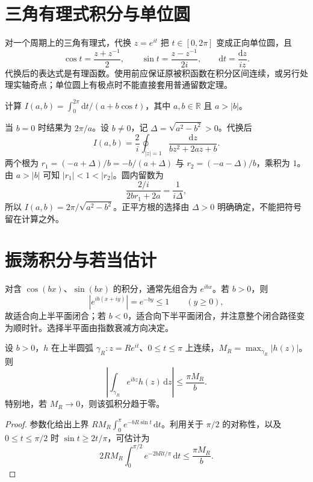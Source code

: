 \documentclass[UTF8,12pt,a4paper,fontset=fandol]{ctexbook}
\begin{document}
\section{三角有理式积分与单位圆}

对一个周期上的三角有理式，代换 $z=e^{it}$ 把 $t\in[0,2\pi]$ 变成正向单位圆，且
\begin{equation}
 \cos t=\frac{z+z^{-1}}2,\qquad
 \sin t=\frac{z-z^{-1}}{2i},\qquad
 \mathrm dt=\frac{\mathrm dz}{iz}.
 \label{eq:cv-trig-substitution}
\end{equation}
代换后的表达式是有理函数。使用前应保证原被积函数在积分区间连续，或另行处理实轴奇点；单位圆上有极点时不能直接套用普通留数定理。

\begin{example}[参数积分]
计算 $I(a,b)=\int_0^{2\pi}\mathrm dt/(a+b\cos t)$，其中 $a,b\in\mathbb R$ 且 $a>|b|$。
\end{example}
\begin{solve}
当 $b=0$ 时结果为 $2\pi/a$。设 $b\ne0$，记 $\Delta=\sqrt{a^2-b^2}>0$。代换后
\[
 I(a,b)=\frac2i\oint_{|z|=1}\frac{\mathrm dz}{bz^2+2az+b}.
\]
两个根为 $r_1=(-a+\Delta)/b=-b/(a+\Delta)$ 与 $r_2=(-a-\Delta)/b$，乘积为 $1$。由 $a>|b|$ 可知 $|r_1|<1<|r_2|$。圆内留数为
\[
 \frac{2/i}{2br_1+2a}=\frac1{i\Delta},
\]
所以 $I(a,b)=2\pi/\sqrt{a^2-b^2}$。正平方根的选择由 $\Delta>0$ 明确确定，不能把符号留在计算之外。
\end{solve}

\section{振荡积分与若当估计}

对含 $\cos(bx)$、$\sin(bx)$ 的积分，通常先组合为 $e^{ibx}$。若 $b>0$，则
\[
 |e^{ib(x+iy)}|=e^{-by}\le1\qquad(y\ge0),
\]
故适合向上半平面闭合；若 $b<0$，适合向下半平面闭合，并注意整个闭合路径变为顺时针。选择半平面由指数衰减方向决定。

\begin{lemma}[若当圆弧估计]
\label{lem:cv-jordan}
设 $b>0$，$h$ 在上半圆弧 $\gamma_R:z=Re^{it}$、$0\le t\le\pi$ 上连续，$M_R=\max_{\gamma_R}|h(z)|$。则
\[
 \left|\int_{\gamma_R}e^{ibz}h(z)\,\mathrm dz\right|
 \le\frac{\pi M_R}{b}.
\]
特别地，若 $M_R\to0$，则该弧积分趋于零。
\end{lemma}
\begin{proof}
参数化给出上界 $RM_R\int_0^\pi e^{-bR\sin t}\,\mathrm dt$。利用关于 $\pi/2$ 的对称性，以及 $0\le t\le\pi/2$ 时 $\sin t\ge2t/\pi$，可估计为
\[
 2RM_R\int_0^{\pi/2}e^{-2bRt/\pi}\,\mathrm dt
 \le\frac{\pi M_R}{b}.
\]
\end{proof}
\end{document}
